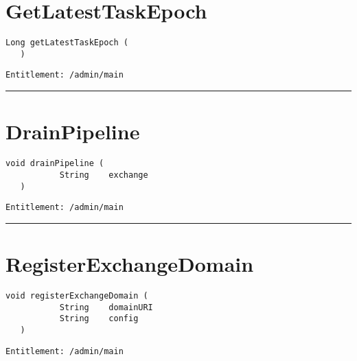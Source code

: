 \section{GetLatestTaskEpoch}
\label{Api:GetLatestTaskEpoch}
\begin{lstlisting}[style=nonumbers]
   Long getLatestTaskEpoch (
   )
\end{lstlisting}
\begin{Verbatim}[formatcom=\color{Maroon}]
  Entitlement: /admin/main
\end{Verbatim}



\rule{12cm}{2pt}
\section{DrainPipeline}
\label{Api:DrainPipeline}
\begin{lstlisting}[style=nonumbers]
   void drainPipeline (
           String    exchange
   )
\end{lstlisting}
\begin{Verbatim}[formatcom=\color{Maroon}]
  Entitlement: /admin/main
\end{Verbatim}



\rule{12cm}{2pt}
\section{RegisterExchangeDomain}
\label{Api:RegisterExchangeDomain}
\begin{lstlisting}[style=nonumbers]
   void registerExchangeDomain (
           String    domainURI
           String    config
   )
\end{lstlisting}
\begin{Verbatim}[formatcom=\color{Maroon}]
  Entitlement: /admin/main
\end{Verbatim}



